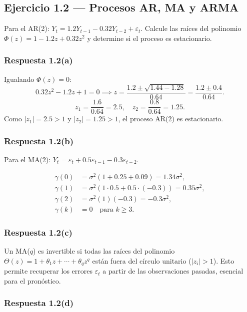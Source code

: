 \documentclass[12pt, letterpaper]{article}
\begin{document}
\subsection{Ejercicio 1.2 — Procesos AR, MA y ARMA}

Para el AR(2): $Y_t = 1.2Y_{t-1} - 0.32Y_{t-2} + \varepsilon_t$. Calcule las raíces del polinomio $\Phi(z) = 1 - 1.2z + 0.32z^2$ y determine si el proceso es estacionario.

\subsubsection*{Respuesta 1.2(a)}

Igualando $\Phi(z)=0$:
\[
0.32z^2 - 1.2z + 1 = 0 \implies z = \frac{1.2 \pm \sqrt{1.44 - 1.28}}{0.64} = \frac{1.2 \pm 0.4}{0.64}.
\]
\[
z_1 = \frac{1.6}{0.64} = 2.5, \quad z_2 = \frac{0.8}{0.64} = 1.25.
\]
Como $|z_1|=2.5>1$ y $|z_2|=1.25>1$, el proceso AR(2) es estacionario.

\subsubsection*{Respuesta 1.2(b)}

Para el MA(2): $Y_t = \varepsilon_t + 0.5\varepsilon_{t-1} - 0.3\varepsilon_{t-2}$.

\begin{align*}
\gamma(0) &= \sigma^2(1 + 0.25 + 0.09) = 1.34\sigma^2, \\
\gamma(1) &= \sigma^2(1\cdot 0.5 + 0.5\cdot(-0.3)) = 0.35\sigma^2, \\
\gamma(2) &= \sigma^2(1)(-0.3) = -0.3\sigma^2, \\
\gamma(k) &= 0 \quad \text{para } k \geq 3.
\end{align*}

\subsubsection*{Respuesta 1.2(c)}

Un MA($q$) es invertible si todas las raíces del polinomio $\Theta(z)=1+\theta_1z+\cdots+\theta_qz^q$ están fuera del círculo unitario ($|z_i|>1$). Esto permite recuperar los errores $\varepsilon_t$ a partir de las observaciones pasadas, esencial para el pronóstico.

\subsubsection*{Respuesta 1.2(d)}
\end{document}
